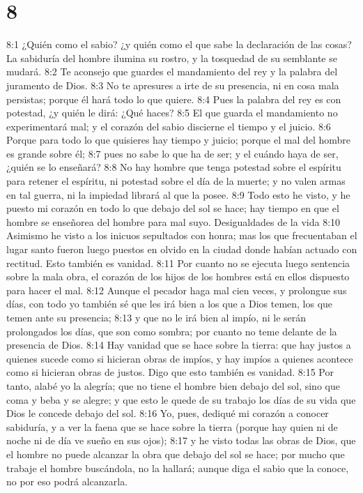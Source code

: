 \chapter{8}


8:1 ¿Quién como el sabio? ¿y quién como el que sabe la declaración de las cosas? La sabiduría del hombre ilumina su rostro, y la tosquedad de su semblante se mudará.  
8:2 Te aconsejo que guardes el mandamiento del rey y la palabra del juramento de Dios.  
8:3 No te apresures a irte de su presencia, ni en cosa mala persistas; porque él hará todo lo que quiere.  
8:4 Pues la palabra del rey es con potestad, ¿y quién le dirá: ¿Qué haces?  
8:5 El que guarda el mandamiento no experimentará mal; y el corazón del sabio discierne el tiempo y el juicio.  
8:6 Porque para todo lo que quisieres hay tiempo y juicio; porque el mal del hombre es grande sobre él;  
8:7 pues no sabe lo que ha de ser; y el cuándo haya de ser, ¿quién se lo enseñará?  
8:8 No hay hombre que tenga potestad sobre el espíritu para retener el espíritu, ni potestad sobre el día de la muerte; y no valen armas en tal guerra, ni la impiedad librará al que la posee.  
8:9 Todo esto he visto, y he puesto mi corazón en todo lo que debajo del sol se hace; hay tiempo en que el hombre se enseñorea del hombre para mal suyo.  
Desigualdades de la vida  
8:10 Asimismo he visto a los inicuos sepultados con honra; mas los que frecuentaban el lugar santo fueron luego puestos en olvido en la ciudad donde habían actuado con rectitud. Esto también es vanidad.  
8:11 Por cuanto no se ejecuta luego sentencia sobre la mala obra, el corazón de los hijos de los hombres está en ellos dispuesto para hacer el mal.  
8:12 Aunque el pecador haga mal cien veces, y prolongue sus días, con todo yo también sé que les irá bien a los que a Dios temen, los que temen ante su presencia;  
8:13 y que no le irá bien al impío, ni le serán prolongados los días, que son como sombra; por cuanto no teme delante de la presencia de Dios.  
8:14 Hay vanidad que se hace sobre la tierra: que hay justos a quienes sucede como si hicieran obras de impíos, y hay impíos a quienes acontece como si hicieran obras de justos. Digo que esto también es vanidad.  
8:15 Por tanto, alabé yo la alegría; que no tiene el hombre bien debajo del sol, sino que coma y beba y se alegre; y que esto le quede de su trabajo los días de su vida que Dios le concede debajo del sol.  
8:16 Yo, pues, dediqué mi corazón a conocer sabiduría, y a ver la faena que se hace sobre la tierra (porque hay quien ni de noche ni de día ve sueño en sus ojos);  
8:17 y he visto todas las obras de Dios, que el hombre no puede alcanzar la obra que debajo del sol se hace; por mucho que trabaje el hombre buscándola, no la hallará; aunque diga el sabio que la conoce, no por eso podrá alcanzarla.  

